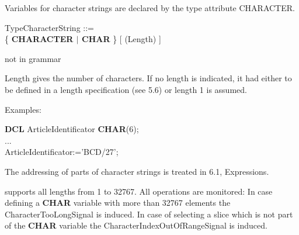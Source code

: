 Variables for character strings are declared by the type attribute
CHARACTER.

\begin{front}
TypeCharacterString ::=\\
\x \{ {\bf CHARACTER $\mid$ CHAR} \} [ (Length) ]
\end{front}
\begin{grammar}
not in grammar
\end{grammar}

Length gives the number of characters. If no length is indicated, it had
either to be defined in a length specification (see 5.6) or length 1 is
assumed.

Examples:

{\bf DCL} ArticleIdentificator {\bf CHAR}(6);\\
...\\
ArticleIdentificator:='BCD/27';

The addressing of parts of character strings is treated in 6.1,
Expressions.

\begin{added}
\OpenPEARL{} supports all lengths from 1 to 32767.
All operations are monitored:
In case defining a {\bf CHAR} variable with more than 32767 elements the
CharacterTooLongSignal is induced.
In case of selecting a slice which is not part of the {\bf CHAR} variable the 
CharacterIndexOutOfRangeSignal is induced.
\end{added}

